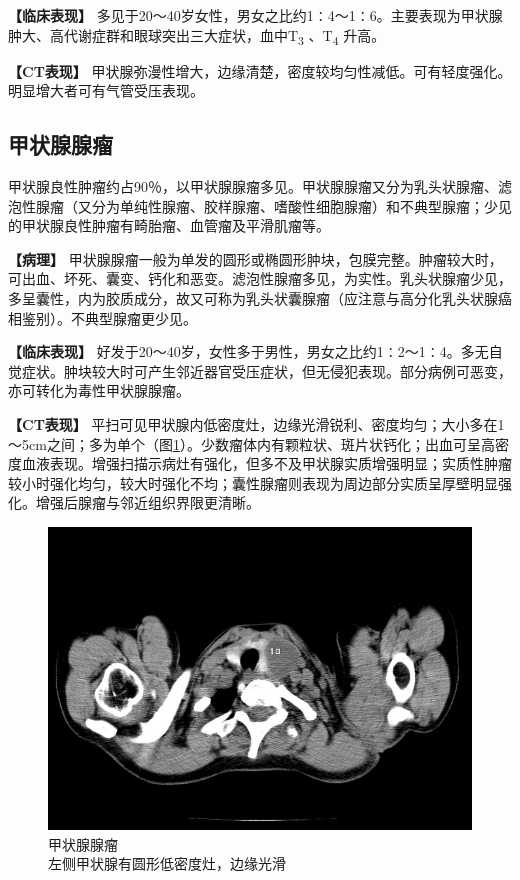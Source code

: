 \textbf{【临床表现】}
多见于20～40岁女性，男女之比约1∶4～1∶6。主要表现为甲状腺肿大、高代谢症群和眼球突出三大症状，血中T\textsubscript{3}
、T\textsubscript{4} 升高。

\textbf{【CT表现】}
甲状腺弥漫性增大，边缘清楚，密度较均匀性减低。可有轻度强化。明显增大者可有气管受压表现。

\subsection{甲状腺腺瘤}

甲状腺良性肿瘤约占90％，以甲状腺腺瘤多见。甲状腺腺瘤又分为乳头状腺瘤、滤泡性腺瘤（又分为单纯性腺瘤、胶样腺瘤、嗜酸性细胞腺瘤）和不典型腺瘤；少见的甲状腺良性肿瘤有畸胎瘤、血管瘤及平滑肌瘤等。

\textbf{【病理】}
甲状腺腺瘤一般为单发的圆形或椭圆形肿块，包膜完整。肿瘤较大时，可出血、坏死、囊变、钙化和恶变。滤泡性腺瘤多见，为实性。乳头状腺瘤少见，多呈囊性，内为胶质成分，故又可称为乳头状囊腺瘤（应注意与高分化乳头状腺癌相鉴别）。不典型腺瘤更少见。

\textbf{【临床表现】}
好发于20～40岁，女性多于男性，男女之比约1∶2～1∶4。多无自觉症状。肿块较大时可产生邻近器官受压症状，但无侵犯表现。部分病例可恶变，亦可转化为毒性甲状腺腺瘤。

\textbf{【CT表现】}
平扫可见甲状腺内低密度灶，边缘光滑锐利、密度均匀；大小多在1～5cm之间；多为单个（图\ref{fig8-10}）。少数瘤体内有颗粒状、斑片状钙化；出血可呈高密度血液表现。增强扫描示病灶有强化，但多不及甲状腺实质增强明显；实质性肿瘤较小时强化均匀，较大时强化不均；囊性腺瘤则表现为周边部分实质呈厚壁明显强化。增强后腺瘤与邻近组织界限更清晰。

\begin{figure}[!htbp]
 \centering
 \includegraphics[width=.7\textwidth,height=\textheight,keepaspectratio]{./images/Image00178.jpg}
 \captionsetup{justification=centering}
 \caption{甲状腺腺瘤\\{\small 左侧甲状腺有圆形低密度灶，边缘光滑}}
 \label{fig8-10}
  \end{figure} 

